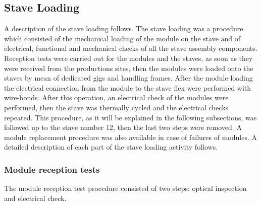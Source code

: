 \subsection{Stave Loading}
A description of the stave loading follows. The stave loading was a procedure which consisted of the mechanical loading of the module on the stave and of electrical, functional and mechanical checks of all the stave assembly components.
Reception tests were carried out for the modules and the staves, as soon as they were received from the productions sites, then the modules were loaded onto the staves by mean of dedicated gigs and handling frames. After the module loading the electrical connection from the module to the stave flex were performed with wire-bonds. After this operation, an electrical check of the modules were performed, then the stave was thermally cycled and the electrical checks repeated.
This procedure, as it will be explained in the following subsections, was followed up to the stave number 12, then the last two steps were removed. A module replacement procedure was also available in case of failures of modules.
A detailed description of each part of the stave loading activity follows.


\subsubsection{Module reception tests}
\label{sec:ModuleReceptionTests}

The module reception test procedure consisted  of two steps: optical inspection and electrical check. %

